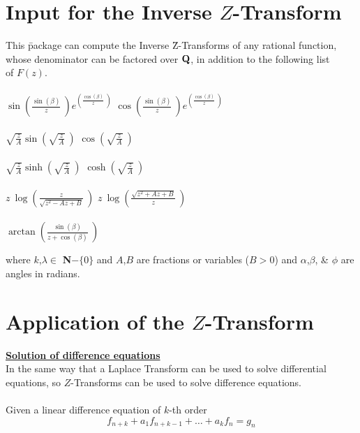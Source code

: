 \section{Input for the Inverse $Z$-Transform}
\begin{tabbing}
  This \= package can compute the Inverse \= Z-Transforms of any 
  rational function, \\ whose denominator can be factored over 
  ${\bf Q}$, in addition to the following list \\ of $F(z)$.\\ \\

\> $\sin \left(\frac{\sin (\beta)}{z} \ \right) 
    e^{\left(\frac{\cos (\beta)}{z} \ \right)}$
\> $\cos \left(\frac{\sin (\beta)}{z} \ \right) 
    e^{\left(\frac{\cos (\beta)}{z} \ \right)}$ \\ \\
\> $\sqrt{\frac{z}{A}} \sin \left( \sqrt{\frac{z}{A}} \ \right)$
\> $\cos \left( \sqrt{\frac{z}{A}} \ \right)$ \\ \\
\> $\sqrt{\frac{z}{A}} \sinh \left( \sqrt{\frac{z}{A}} \ \right)$
\> $\cosh \left( \sqrt{\frac{z}{A}} \ \right)$ \\ \\
\> $z \ \log \left(\frac{z}{\sqrt{z^2-A z+B}} \ \right)$
\> $z \ \log \left(\frac{\sqrt{z^2+A z+B}}{z} \ \right)$ \\ \\
\> $\arctan \left(\frac{\sin (\beta)}{z+\cos (\beta)} \ \right)$
\\
\end{tabbing}

  where $k$,$\lambda \in$ {\bf N}$ -  \{0\}$ and $A$,$B$ are fractions
  or variables ($B>0$) and $\alpha$,$\beta$, \&  $\phi$ are angles 
  in radians.

\section{Application of the $Z$-Transform}
\underline {{\bf Solution of difference equations}}\\

  In the same way that a Laplace Transform can be used to
  solve differential equations, so $Z$-Transforms can be used
  to solve difference equations.\\ \\
  Given a linear difference equation of $k$-th order
\begin{equation}
  f_{n+k} + a_1 f_{n+k-1}+ \ldots + a_k f_n = g_n
\label{eq:1}
\end{equation}

